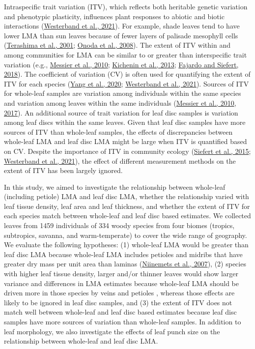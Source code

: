 \documentclass[
  12pt,
  a4paper,
,tablecaptionabove
]{scrartcl}
\begin{document}
Intraspecific trait variation (ITV), which reflects both heritable genetic variation and phenotypic plasticity, influences plant responses to abiotic and biotic interactions (\protect\hyperlink{ref-Westerband2021}{Westerband et al., 2021}).
For example, shade leaves tend to have lower LMA than sun leaves because of fewer layers of palisade mesophyll cells (\protect\hyperlink{ref-Terashima2001}{Terashima et al., 2001}; \protect\hyperlink{ref-Onoda2008}{Onoda et al., 2008}).
The extent of ITV within and among communities for LMA can be similar to or greater than interspecific trait variation (e.g., \protect\hyperlink{ref-Messier2010}{Messier et al., 2010}; \protect\hyperlink{ref-Kichenin2013}{Kichenin et al., 2013}; \protect\hyperlink{ref-Fajardo2018}{Fajardo and Siefert, 2018}).
The coefficient of variation (CV) is often used for quantifying the extent of ITV for each species (\protect\hyperlink{ref-Yang2020}{Yang et al., 2020}; \protect\hyperlink{ref-Westerband2021}{Westerband et al., 2021}).
Sources of ITV for whole-leaf samples are variation among individuals within the same species and variation among leaves within the same individuals (\protect\hyperlink{ref-Messier2010}{Messier et al., 2010}, \protect\hyperlink{ref-Messier2017}{2017}).
An additional source of trait variation for leaf disc samples is variation among leaf discs within the same leaves.
Given that leaf disc samples have more sources of ITV than whole-leaf samples, the effects of discrepancies between whole-leaf LMA and leaf disc LMA might be large when ITV is quantified based on CV.
Despite the importance of ITV in community ecology (\protect\hyperlink{ref-Siefert2015}{Siefert et al., 2015}; \protect\hyperlink{ref-Westerband2021}{Westerband et al., 2021}), the effect of different measurement methods on the extent of ITV has been largely ignored.

In this study, we aimed to investigate the relationship between whole-leaf (including petiole) LMA and leaf disc LMA,
whether the relationship varied with leaf tissue density, leaf area and leaf thickness, and
whether the extent of ITV for each species match between whole-leaf and leaf disc based estimates.
We collected leaves from 1459 individuals of 334 woody species from four biomes (tropics, subtropics, savanna, and warm-temperate) to cover the wide range of geography.
We evaluate the following hypotheses:
(1) whole-leaf LMA would be greater than leaf disc LMA because whole-leaf LMA includes petioles and midribs that have greater dry mass per unit area than laminas (\protect\hyperlink{ref-Niinemets2007}{Niinemets et al., 2007}),
(2) species with higher leaf tissue density, larger and/or thinner leaves would show larger variance and differences in LMA estimates because whole-leaf LMA should be driven more in those species by veins and petioles , whereas those effects are likely to be ignored in leaf disc samples, and
(3) the extent of ITV does not match well between whole-leaf and leaf disc based estimates because leaf disc samples have more sources of variation than whole-leaf samples.
In addition to leaf morphology, we also investigate the effects of leaf punch size on the relationship between whole-leaf and leaf disc LMA.
\end{document}
